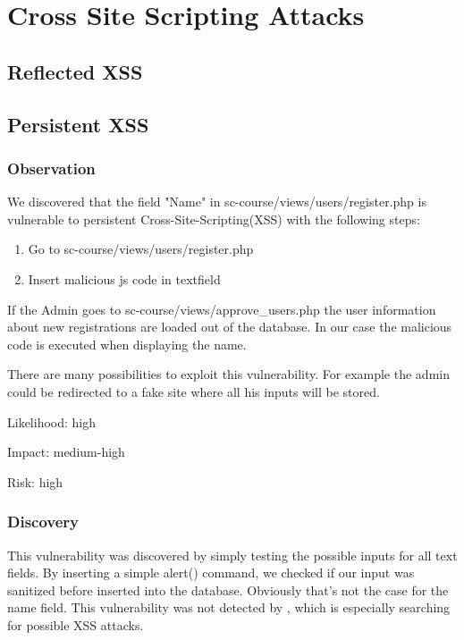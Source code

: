 \chapter{Cross Site Scripting Attacks}

\section{Reflected XSS}

\section{Persistent XSS}

\subsection{Observation}

We discovered that the field "Name" in sc-course/views/users/register.php is vulnerable to persistent Cross-Site-Scripting(XSS) with the following steps:
\begin{enumerate}
 \item Go to sc-course/views/users/register.php
 \item Insert malicious js code in textfield
\end{enumerate}
 If the Admin goes to sc-course/views/approve\_users.php the user information about new registrations are  loaded out of the database. In our case the malicious code is executed when displaying the name.

There are many possibilities to exploit this vulnerability. For example the admin could be redirected to a fake site where all his inputs will be stored.\newline


Likelihood: high \newline

Impact: medium-high\newline

Risk: high\newline

\subsection{Discovery}

This vulnerability was discovered by simply testing the possible inputs for all text fields. By inserting a simple alert() command, we checked if our input was sanitized before inserted into the database. Obviously that's not the case for the name field. This vulnerability was not detected by , which is especially searching for possible XSS attacks.


